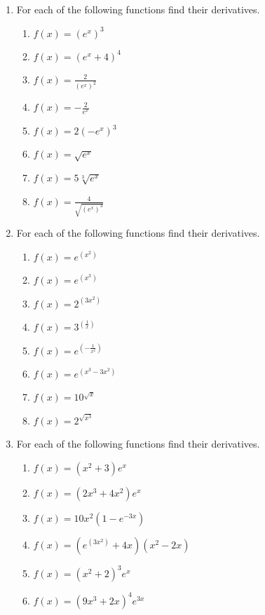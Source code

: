 \documentclass[a4paper,12pt]{article}
\begin{document}
\begin{enumerate}
\item For each of the following functions find their derivatives.
    \begin{multicols}{2}
    \begin{enumerate}
    \item \spacer$f(x) = (e^x)^3$
    \item \spacer$f(x) = (e^x + 4)^4$
    \item \spacer$f(x) = \frac{2}{(e^x)^2}$
    \item \spacer$f(x) = -\frac{2}{e^x}$
    \item \spacer$f(x) = 2(-e^x)^3$
    \item \spacer$f(x) = \sqrt{e^x}$
    \item \spacer$f(x) = 5\sqrt[3]{e^x}$
    \item \spacer$f(x) = \frac{4}{\sqrt{(e^x)^3}}$
    \end{enumerate}
    \end{multicols}

\newpage
\item For each of the following functions find their derivatives. 
    \begin{multicols}{2}
    \begin{enumerate}
    \item \sspacer$f(x) = e^{(x^2)}$
    \item \sspacer$f(x) = e^{(x^3)}$
    \item \sspacer$f(x) = 2^{(3x^2)}$
    \item \sspacer$f(x) = 3^{\left(\frac{1}{x}\right)}$
    \item \sspacer$f(x) = e^{\left(-\frac{1}{x^2}\right)}$
    \item \sspacer$f(x) = e^{(x^3 - 3x^2)}$
    \item \sspacer$f(x) = 10^{\sqrt{x}}$
    \item \sspacer$f(x) = 2^{\sqrt{x^3}}$
    \end{enumerate}
    \end{multicols}

\item For each of the following functions find their derivatives.
    \begin{multicols}{2}
    \begin{enumerate}
    \item \sspacer$f(x) = (x^2 + 3)e^x$
    \item \sspacer$f(x) = (2x^3 + 4x^2)e^x$
    \item \sspacer$f(x) = 10x^2(1 - e^{-3x})$
    \item \sspacer$f(x) = (e^{(3x^2)} + 4x)(x^2 - 2x)$
    \item \sspacer$f(x) = (x^2 + 2)^3e^x$
    \item \sspacer$f(x) = (9x^3 + 2x)^4e^{3x}$
    \end{enumerate}
    \end{multicols}


\end{enumerate}
\end{document}
